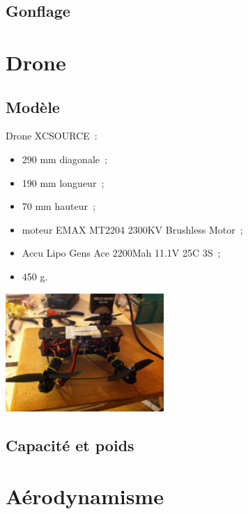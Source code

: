\documentclass{beamer}
\begin{document}
\subsection{Gonflage}

\section{Drone}

\subsection{Modèle}

\begin{frame}
  \begin{multicols}{2}
    Drone XCSOURCE~: \\
    \begin{itemize}
      \item 290 mm diagonale~;
      \item 190 mm longueur~;
      \item 70 mm hauteur~;
      \item moteur EMAX MT2204 2300KV Brushless Motor~;
      \item Accu Lipo Gens Ace 2200Mah 11.1V 25C 3S~;
      \item 450 g.
    \end{itemize}
    \newpage
    \begin{center}
      \includegraphics[width=6cm]{../Images/drone.JPG}
    \end{center}
  \end{multicols}
\end{frame}

\subsection{Capacité et poids}

\section{Aérodynamisme}
\end{document}
